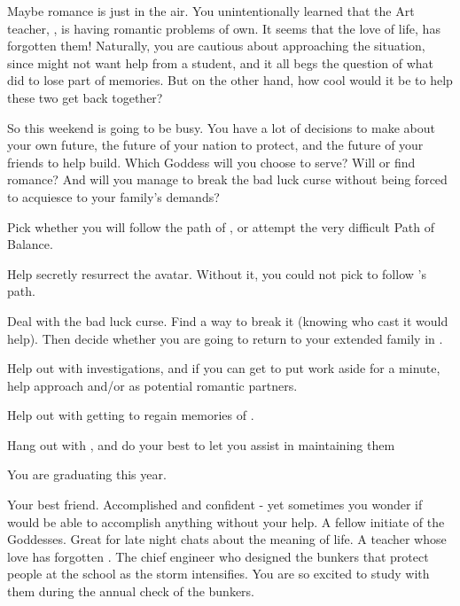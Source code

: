 \documentclass[char]{GL2020}
\begin{document}
Maybe romance is just in the air. You unintentionally learned that the Art teacher, \cChupAvenger{}, is having romantic problems of \cChupAvenger{\their} own. It seems that the love of \cChupAvenger{\their} life, \cHeadScientist{} has forgotten them! Naturally, you are cautious about approaching the situation, since \cChupAvenger{} might not want help from a student, and it all begs the question of what \cHeadScientist{} did to lose part of \cHeadScientist{\their} memories. But on the other hand, how cool would it be to help these two get back together?

So this weekend is going to be busy. You have a lot of decisions to make about your own future, the future of your nation to protect, and the future of your friends to help build. Which Goddess will you choose to serve? Will \cPresident{} or \cChupAvenger{} find romance? And will you manage to break the bad luck curse without being forced to acquiesce to your \pFarm{} family's demands?

\begin{itemz}[Goals]
	\item Pick whether you will follow the path of \cEbb{\full}, \cFlow{\full} or attempt the very difficult Path of Balance.
	\item Help secretly resurrect the \cEbb{} avatar. Without it, you could not pick to follow \cEbb{}'s path.
	\item Deal with the bad luck curse. Find a way to break it (knowing who cast it would help). Then decide whether you are going to return to your extended family in \pFarm{}.
	\item Help \cPresident{} out with \cPresident{\their} investigations, and if you can get \cPresident{\them} to put work aside for a minute, help \cPresident{\them} approach \cHeir{} and/or \cChupStudent{} as potential romantic partners.
	\item Help \cChupAvenger{} out with getting \cHeadScientist{} to regain \cHeadScientist{\their} memories of \cChupAvenger{}.
	\item Hang out with \cBunker{}, and do your best to let you assist \cBunker{\them} in maintaining them
\end{itemz}

\begin{itemz}[Notes]
	\item You are graduating this year.
\end{itemz}

\begin{contacts}
	\contact{\cPresident{}} Your best friend. Accomplished and confident - yet sometimes you wonder if \cPresident{\they} would be able to accomplish anything without your help.
	\contact{\cWarlordDaughter{}} A fellow initiate of the Goddesses. Great for late night chats about the meaning of life.
	\contact{\cChupAvenger{}} A teacher whose love has forgotten \cChupAvenger{\them}.
	\contact{\cBunker{}} The chief engineer who designed the bunkers that protect people at the school as the storm intensifies. You are so excited to study with them during the annual check of the bunkers.
\end{contacts}
\end{document}
